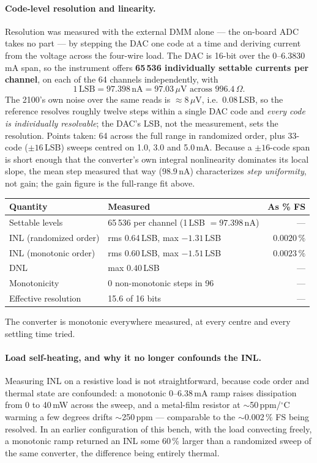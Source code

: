 \documentclass[11pt]{article}
\begin{document}
\paragraph{Code-level resolution and linearity.} Resolution was measured with
the external DMM alone --- the on-board ADC takes no part --- by stepping the
DAC one code at a time and deriving current from the voltage across the
four-wire load. The DAC is 16-bit over the 0--6.3830\,mA span, so the
instrument offers \textbf{65\,536 individually settable currents per channel},
on each of the 64 channels independently, with
\[
  1\,\text{LSB} = 97.398\,\text{nA} = 97.03\,\mu\text{V across }996.4\,\Omega .
\]
The 2100's own noise over the same reads is $\approx$8\,$\mu$V, i.e.\ $0.08$\,LSB,
so the reference resolves roughly twelve steps within a single DAC code and
\emph{every code is individually resolvable}; the DAC's LSB, not the
measurement, sets the resolution. Points taken: 64 across the full range in
randomized order, plus 33-code ($\pm16$\,LSB) sweeps centred on 1.0, 3.0 and
5.0\,mA. Because a $\pm16$-code span is short enough that the converter's own
integral nonlinearity dominates its local slope, the mean step measured that way
($98.9$\,nA) characterizes \emph{step uniformity}, not gain; the gain figure is
the full-range fit above.

\medskip
\noindent\begin{tabular}{@{}llr@{}}
\toprule
\textbf{Quantity} & \textbf{Measured} & \textbf{As \% FS} \\
\midrule
Settable levels & 65\,536 per channel (1\,LSB $=97.398$\,nA) & --- \\
INL (randomized order) & rms 0.64\,LSB, max $-1.31$\,LSB & $0.0020\,\%$ \\
INL (monotonic order) & rms 0.60\,LSB, max $-1.51$\,LSB & $0.0023\,\%$ \\
DNL & max $0.40$\,LSB & --- \\
Monotonicity & 0 non-monotonic steps in 96 & --- \\
Effective resolution & 15.6 of 16 bits & --- \\
\bottomrule
\end{tabular}
\medskip

The converter is monotonic everywhere measured, at every centre and every
settling time tried.

\paragraph{Load self-heating, and why it no longer confounds the INL.} Measuring
INL on a resistive load is not straightforward, because code order and thermal
state are confounded: a monotonic 0--6.38\,mA ramp raises dissipation from 0 to
40\,mW across the sweep, and a metal-film resistor at $\sim$50\,ppm/$^\circ$C
warming a few degrees drifts $\sim$250\,ppm --- comparable to the
$\sim$0.002\,\% FS being resolved. In an earlier configuration of this bench,
with the load convecting freely, a monotonic ramp returned an INL some 60\,\%
larger than a randomized sweep of the same converter, the difference being
entirely thermal.
\end{document}

